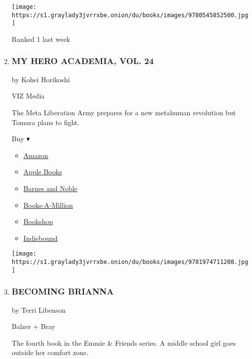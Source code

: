 \begin{enumerate}
  \texttt{[image: https://s1.graylady3jvrrxbe.onion/du/books/images/9780545852500.jpg]}

  Ranked 1 last week
\item
  \hypertarget{my-hero-academia-vol-24}{%
  \subsubsection{MY HERO ACADEMIA, VOL.
  24}\label{my-hero-academia-vol-24}}

  by Kohei Horikoshi

  VIZ Media

  The Meta Liberation Army prepares for a new metahuman revolution but
  Tomura plans to fight.

  Buy ▾

  \begin{itemize}
  \tightlist
  \item
    \href{https://www.amazon.com/dp/197471120X?tag=NYTBSREV-20\&tag=NYTBS-20}{Amazon}
  \item
    \href{https://du-gae-books-dot-nyt-du-prd.appspot.com/buy?title=MY+HERO+ACADEMIA\%2C+VOL.+24\&author=Kohei+Horikoshi}{Apple
    Books}
  \item
    \href{https://www.anrdoezrs.net/click-7990613-11819508?url=https\%3A\%2F\%2Fwww.barnesandnoble.com\%2Fw\%2F\%3Fean\%3D9781974711208}{Barnes
    and Noble}
  \item
    \href{https://www.anrdoezrs.net/click-7990613-35140?url=https\%3A\%2F\%2Fwww.booksamillion.com\%2Fp\%2FMY\%2BHERO\%2BACADEMIA\%252C\%2BVOL.\%2B24\%2FKohei\%2BHorikoshi\%2F9781974711208}{Books-A-Million}
  \item
    \href{https://bookshop.org/a/3546/9781974711208}{Bookshop}
  \item
    \href{https://www.indiebound.org/book/9781974711208?aff=NYT}{Indiebound}
  \end{itemize}

  \texttt{[image: https://s1.graylady3jvrrxbe.onion/du/books/images/9781974711208.jpg]}
\item
  \hypertarget{becoming-brianna}{%
  \subsubsection{BECOMING BRIANNA}\label{becoming-brianna}}

  by Terri Libenson

  Balzer + Bray

  The fourth book in the Emmie \& Friends series. A middle school girl
  goes outside her comfort zone.


\end{enumerate}
